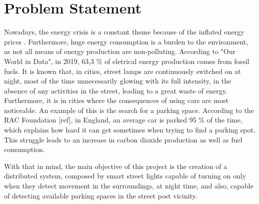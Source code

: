 \section{Problem Statement}
%
Nowadays, the energy crisis is a constant theme because of the inflated energy prices \cite{energy_crisis}. Furthermore, huge energy consumption is a burden to the environment, as not all means of energy production are non-polluting. According to "Our World in Data"\cite{owidenergy}, in 2019, 63,3 \% of eletrical energy production comes from fossil fuels. It is known that, in cities, street lamps are continuously switched on at night, most of the time unnecessarily glowing with its full intensity, in the absence of any activities in the street, leading to a great waste of energy. Furthermore, it is in cities where the consequences of using cars are most noticeable. An example of this is the search for a parking space. According to the RAC Foundation [ref], in England, an average car is parked 95 \% of the time, which explains how hard it can get sometimes when trying to find a parking spot. This struggle leads to an increase in carbon dioxide production as well as fuel consumption.

With that in mind, the main objective of this project is the creation of a  distributed system, composed by smart street lights capable of turning on only when they detect movement in the surroundings, at night time, and also, capable of detecting available parking spaces in the street post vicinity.



